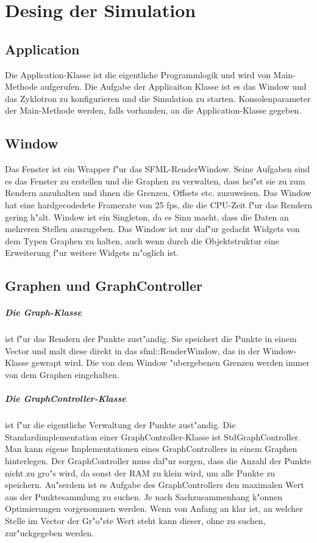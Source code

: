 \documentclass[14pt, a4paper]{report}
\begin{document}
\chapter{Desing der Simulation}
\section{Application}
Die Application-Klasse ist die eigentliche Programmlogik und wird von Main-Methode
aufgerufen. Die Aufgabe der Applicaiton Klasse ist es das Window und das Zyklotron
zu konfigurieren und die Simulation zu starten. Konsolenparameter der Main-Methode
werden, falls vorhanden, an die Application-Klasse gegeben.

\section{Window} 
Das Fenster ist ein Wrapper f"ur das SFML-RenderWindow. Seine Aufgaben sind es das 
Fenster zu erstellen und die Graphen zu verwalten, dass hei"st sie zu zum Rendern 
anzuhalten und ihnen die Grenzen, Offsets etc. zuzuweisen. Das Window hat eine 
hardgecodedete Framerate von 25 fps, die die CPU-Zeit f"ur das Rendern gering h"alt.
Window ist ein Singleton, da es Sinn macht, dass die Daten an mehreren Stellen 
auszugeben. Das Window ist nur daf"ur gedacht Widgets von dem Typen Graphen zu halten,
auch wenn durch die Objektstruktur eine Erweiterung f"ur weitere Widgets m"oglich ist.

\section{Graphen und GraphController}
\paragraph{Die Graph-Klasse} ist f"ur das Rendern der Punkte zust"andig. Sie speichert
die Punkte in einem Vector und malt diese direkt in das sfml::RenderWindow, das in der
Window-Klasse gewrapt wird. Die von dem Window "ubergebenen Grenzen werden immer von dem
Graphen eingehalten.

\paragraph{Die GraphController-Klasse} ist f"ur die eigentliche Verwaltung der Punkte
zust"andig. Die Standardimplementation einer GraphController-Klasse ist 
StdGraphController. Man kann eigene Implementationen eines GraphControllers in einem
Graphen hinterlegen. Der GraphController muss daf"ur sorgen, dass die Anzahl der Punkte
nicht zu gro"s wird, da sonst der RAM zu klein wird, um alle Punkte zu speichern. 
Au"serdem ist es Aufgabe des GraphControllers den maximalen Wert aus der Punktesammlung
zu suchen. Je nach Sachzusammenhang k"onnen Optimierungen vorgenommen werden. Wenn von
Anfang an klar ist, an welcher Stelle im Vector der Gr"o"ste Wert steht kann dieser,
ohne zu suchen, zur"uckgegeben werden.
\end{document}
